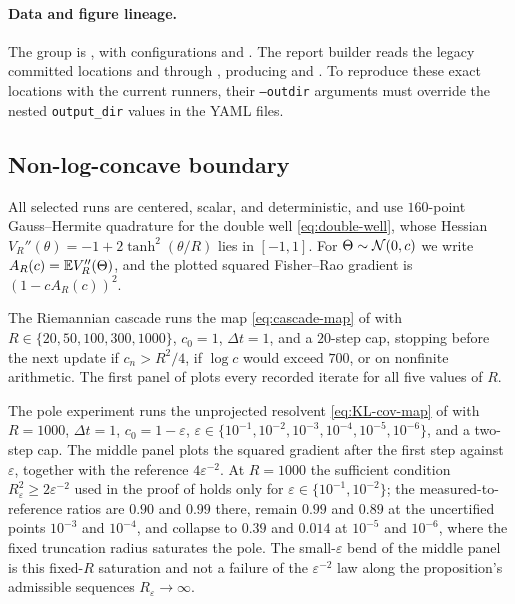 \paragraph{Data and figure lineage.}
\begingroup\small\raggedright
The group is , with configurations
 and . The report
builder reads the legacy committed locations
 and
 through
, producing
 and
. To reproduce these exact locations
with the current runners, their \texttt{--outdir} arguments must override the
nested \texttt{output\_dir} values in the YAML files.
\par\endgroup

\subsection{Non-log-concave boundary}

All selected runs are centered, scalar, and deterministic, and use $160$-point
Gauss--Hermite quadrature for the double well \eqref{eq:double-well}, whose
Hessian $V_R''(\theta) = -1+2\tanh^2(\theta/R)$ lies in $[-1,1]$. For
$\Theta\sim\mathcal{N}(0,c)$ we write $A_R(c) = \mathbb{E} V_R''(\Theta)$, and the plotted
squared Fisher--Rao gradient is $(1-cA_R(c))^2$.

The Riemannian cascade runs the map \eqref{eq:cascade-map} of
 with $R\in\{20,50,100,300,1000\}$, $c_0 = 1$,
$\Delta t = 1$, and a $20$-step cap, stopping before the next update if
$c_n>R^2/4$, if $\log c$ would exceed $700$, or on nonfinite arithmetic. The
first panel of  plots every recorded iterate for all
five values of $R$.

The pole experiment runs the unprojected resolvent \eqref{eq:KL-cov-map} of
 with $R = 1000$, $\Delta t = 1$, $c_0 = 1-\varepsilon$,
$\varepsilon\in\{10^{-1},10^{-2},10^{-3},10^{-4},10^{-5},10^{-6}\}$, and a
two-step cap. The middle panel plots the squared gradient after the first step
against $\varepsilon$, together with the reference $4\varepsilon^{-2}$. At
$R=1000$ the sufficient condition $R_\varepsilon^2\geq2\varepsilon^{-2}$ used in
the proof of  holds only for
$\varepsilon\in\{10^{-1},10^{-2}\}$; the measured-to-reference ratios are
$0.90$ and $0.99$ there, remain $0.99$ and $0.89$ at the uncertified points
$10^{-3}$ and $10^{-4}$, and collapse to $0.39$ and $0.014$ at $10^{-5}$ and
$10^{-6}$, where the fixed truncation radius saturates the pole. The
small-$\varepsilon$ bend of the middle panel is this fixed-$R$ saturation and
not a failure of the $\varepsilon^{-2}$ law along the proposition's admissible
sequences $R_\varepsilon\to\infty$.

